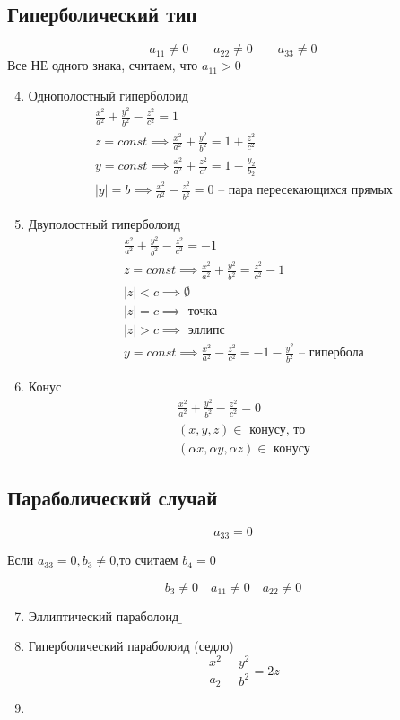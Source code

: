 \documentclass[main]{subfiles}
\begin{document}
\subsection{Гиперболический тип}
\[a_{11} \neq 0 \qquad a_{22} \neq 0 \qquad a_{33} \neq 0\]
Все НЕ одного знака, считаем, что $a_{11} >0$
\begin{enumerate}
    \setcounter{enumi}{3}
    \item Однополостный гиперболоид
          \begin{gather*}
              \frac{x^2}{a^2} + \frac{y^2}{b^2} - \frac{z^2}{c^2} = 1\\
              z = const \implies \frac{x^2}{a^2} + \frac{y^2}{b^2} = 1 + \frac{z^2}{c^2}\\
              y = const \implies \frac{x^2}{a^2} + \frac{z^2}{c^2} = 1 - \frac{y_2}{b_2}\\
              |y|=b \implies \frac{x^2}{a^2} - \frac{z^2}{b^2} = 0 \text{ -- пара пересекающихся прямых}
          \end{gather*}
    \item Двуполостный гиперболоид
          \begin{gather*}
              \frac{x^2}{a^2} + \frac{y^2}{b^2} - \frac{z^2}{c^2} = -1\\
              z = const \implies \frac{x^2}{a^2} + \frac{y^2}{b^2} = \frac{z^2}{c^2} -1\\
              |z| < c \implies \emptyset\\
              |z| = c \implies \text{ точка}\\
              |z| > c \implies \text{ эллипс}\\
              y = const \implies \frac{x^2}{a^2} - \frac{z^2}{c^2} = -1 - \frac{y^2}{b^2}\text{ -- гипербола}
          \end{gather*}
    \item Конус
          \begin{gather*}
              \frac{x^2}{a^2} + \frac{y^2}{b^2} - \frac{z^2}{c^2} = 0\\
              (x,y,z) \in \text{ конусу, то}\\
              (\alpha x, \alpha y, \alpha z) \in \text{ конусу}
          \end{gather*}
\end{enumerate}

\subsection{Параболический случай}
\[a_{33} = 0\]
\begin{lemma}
    Если $a_{33} = 0, b_3 \neq 0$,то считаем $b_4=0$
\end{lemma}
\[b_3 \neq 0 \quad a_{11} \neq 0 \quad a_{22} \neq 0\]
\begin{enumerate}
    \setcounter{enumi}{6}
    \item Эллиптический параболоид
          \b
    \item Гиперболический параболоид (седло)
          \[\frac{x^2}{a_2} - \frac{y^2}{b^2} = 2z\]
    \item
\end{enumerate}
\end{document}
